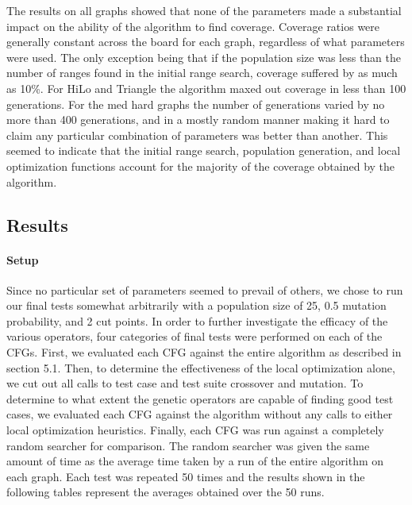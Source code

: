 \documentclass[runningheads]{llncs}
\begin{document}
The results on all graphs showed that none of the parameters made a substantial impact on the ability of the algorithm to find coverage. Coverage ratios were generally constant across the board for each graph, regardless of what parameters were used. The only exception being that if the population size was less than the number of ranges found in the initial range search, coverage suffered by as much as 10\%. For HiLo and Triangle the algorithm maxed out coverage in less than 100 generations. For the med hard graphs the number of generations varied by no more than 400 generations, and in a mostly random manner making it hard to claim any particular combination of parameters was better than another. This seemed to indicate that the initial range search, population generation, and local optimization functions account for the majority of the coverage obtained by the algorithm.

\subsection{Results}
\paragraph{Setup}Since no particular set of parameters seemed to prevail of others, we chose to run our final tests somewhat arbitrarily with a population size of 25, 0.5 mutation probability, and 2 cut points. In order to further investigate the efficacy of the various operators, four categories of final tests were performed on each of the CFGs. First, we evaluated each CFG against the entire algorithm as described in section 5.1. Then, to determine the effectiveness of the local optimization alone, we cut out all calls to test case and test suite crossover and mutation. To determine to what extent the genetic operators are capable of finding good test cases, we evaluated each CFG against the algorithm without any calls to either local optimization heuristics. Finally, each CFG was run against a completely random searcher for comparison. The random searcher was given the same amount of time as the average time taken by a run of the entire algorithm on each graph. Each test was repeated 50 times and the results shown in the following tables represent the averages obtained over the 50 runs. 
\end{document}
